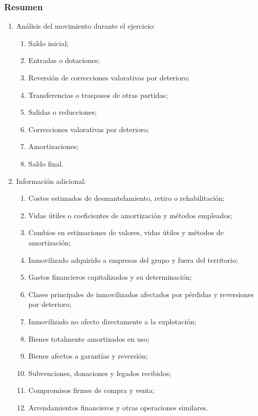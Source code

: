 \documentclass[a4paper,12pt]{article}
\begin{document}
\subsubsection{Resumen}

\begin{enumerate}
    \item Análisis del movimiento durante el ejercicio:
    \begin{enumerate}
        \item Saldo inicial;
        \item Entradas o dotaciones;
        \item Reversión de correcciones valorativas por deterioro;
        \item Transferencias o traspasos de otras partidas;
        \item Salidas o reducciones;
        \item Correcciones valorativas por deterioro;
        \item Amortizaciones;
        \item Saldo final.
    \end{enumerate}
    \item Información adicional:
    \begin{enumerate}
        \item Costes estimados de desmantelamiento, retiro o rehabilitación;
        \item Vidas útiles o coeficientes de amortización y métodos empleados;
        \item Cambios en estimaciones de valores, vidas útiles y métodos de amortización;
        \item Inmovilizado adquirido a empresas del grupo y fuera del territorio;
        \item Gastos financieros capitalizados y su determinación;
        \item Clases principales de inmovilizados afectados por pérdidas y reversiones por deterioro;
        \item Inmovilizado no afecto directamente a la explotación;
        \item Bienes totalmente amortizados en uso;
        \item Bienes afectos a garantías y reversión;
        \item Subvenciones, donaciones y legados recibidos;
        \item Compromisos firmes de compra y venta;
        \item Arrendamientos financieros y otras operaciones similares.
    \end{enumerate}
\end{enumerate}
\end{document}
